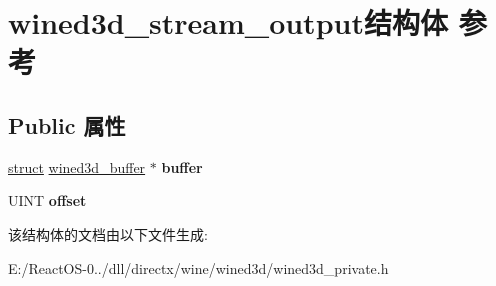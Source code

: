 \hypertarget{structwined3d__stream__output}{}\section{wined3d\+\_\+stream\+\_\+output结构体 参考}
\label{structwined3d__stream__output}
\subsection*{Public 属性}
\begin{DoxyCompactItemize}
\item 
\mbox{\label{structwined3d__stream__output_aee3aa787155cda1eee1b9d3eaa9a5823}} 
\hyperlink{interfacestruct}{struct} \hyperlink{structwined3d__buffer}{wined3d\+\_\+buffer} $\ast$ {\bfseries buffer}
\item 
\mbox{\label{structwined3d__stream__output_a9b74e0f1d8c56a265505c6c5bb71eba9}} 
U\+I\+NT {\bfseries offset}
\end{DoxyCompactItemize}


该结构体的文档由以下文件生成\+:\begin{DoxyCompactItemize}
\item 
E\+:/\+React\+O\+S-\/0../dll/directx/wine/wined3d/wined3d\+\_\+private.\+h\end{DoxyCompactItemize}
